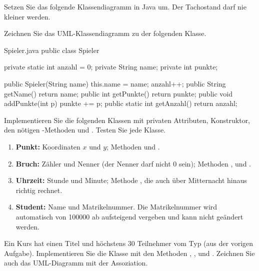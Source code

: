 \ueben
{}
Setzen Sie das folgende Klassendiagramm in Java um. Der Tachostand darf nie kleiner werden.
\begin{center}
\end{center}

Zeichnen Sie das UML-Klassendiagramm zu der folgenden Klasse.
\begin{javacode}{Spieler.java}
public class Spieler {
	private static int anzahl = 0;
	private String name;
	private int punkte;

	public Spieler(String name) { this.name = name; anzahl++; }
	public String getName() { return name; }
	public int getPunkte() { return punkte; }
	public void addPunkte(int p) { punkte += p; }
	public static int getAnzahl() { return anzahl; }
}
\end{javacode}

Implementieren Sie die folgenden Klassen mit privaten Attributen, Konstruktor, den nötigen -Methoden und . Testen Sie jede Klasse.
\begin{enumerate}[label=\alph*)]
\item \textbf{Punkt:} Koordinaten $x$ und $y$; Methoden  und .
\item \textbf{Bruch:} Zähler und Nenner (der Nenner darf nicht 0 sein); Methoden ,  und .
\item \textbf{Uhrzeit:} Stunde und Minute; Methode , die auch über Mitternacht hinaus richtig rechnet.
\item \textbf{Student:} Name und Matrikelnummer. Die Matrikelnummer wird automatisch von 100000 ab aufsteigend vergeben und kann nicht geändert werden.
\end{enumerate}

Ein Kurs hat einen Titel und höchstens 30 Teilnehmer vom Typ  (aus der vorigen Aufgabe). Implementieren Sie die Klasse  mit den Methoden , ,  und . Zeichnen Sie auch das UML-Diagramm mit der Assoziation.

